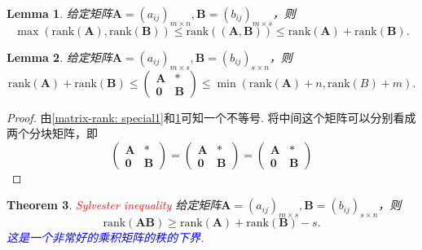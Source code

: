 \documentclass{article}
\newtheorem{theorem}{Theorem}[section]
\newtheorem{lemma}[theorem]{Lemma}
\newcommand{\mbf}[1]{\bm{#1}}
\newcommand{\rank}[1]{\text{rank}\left(#1\right)} %
\newcommand{\redt}[1]{\textcolor{red}{#1}}
\newcommand{\bluet}[1]{\textcolor{blue}{#1}}
\begin{document}
\begin{lemma}\label{matrix-rank: special2}
\rm 给定矩阵$\mbf{A}=(a_{ij})_{m \times n},\mbf{B}=(b_{ij})_{m \times s}$，则
$$
\max(\rank{\mbf{A}},\rank{\mbf{B}}) \leq \rank{(\mbf{A},\mbf{B})} \leq \rank{\mbf{A}}+\rank{\mbf{B}}.
$$
\end{lemma}

\begin{lemma}\label{matrix-rank: special3}
\rm 给定矩阵$\mbf{A}=(a_{ij})_{m \times s},\mbf{B}=(b_{ij})_{s \times n}$，则
$$
\rank{\mbf{A}} + \rank{\mbf{B}} \leq \begin{pmatrix}
\mbf{A} & \mbf{*}\\
\mbf{0} & \mbf{B}
\end{pmatrix} \leq \min(\rank{\mbf{A}}+n,\rank{B}+m).
$$
\end{lemma}

\begin{proof}
由\ref{matrix-rank: special1}和\ref{matrix-rank: special2}可知一个不等号. 将中间这个矩阵可以分别看成两个分块矩阵，即
$$
\begin{pmatrix}
\mbf{A} & \mbf{*}\\
\mbf{0} & \mbf{B}
\end{pmatrix} = \left(\begin{array}{c|c}
\mbf{A} & \mbf{*}\\
\mbf{0} & \mbf{B}
\end{array}\right) = \left(\begin{array}{cc}
\mbf{A} & \mbf{*}\\
\hline
\mbf{0} & \mbf{B}
\end{array}\right)
$$
\end{proof}

\begin{theorem}\label{sylvester-inequality}
\rm \redt{Sylvester inequality} 给定矩阵$\mbf{A}=(a_{ij})_{m \times s},\mbf{B}=(b_{ij})_{s \times n}$，则
$$
\rank{\mbf{A}\mbf{B}} \geq \rank{\mbf{A}} + \rank{\mbf{B}} -  s.
$$
\bluet{这是一个非常好的乘积矩阵的秩的下界}.
\end{theorem}
\end{document}
